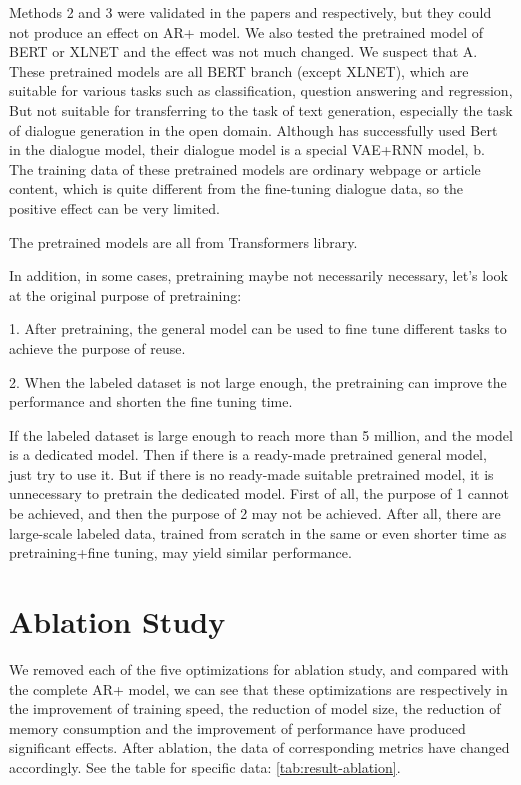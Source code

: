\documentclass[letterpaper]{article} %
\DeclareRobustCommand{\citeext}[1]{\cite[#1]{#1}}
\begin{document}
Methods 2 and 3 were validated in the papers \citeext{Devlin2019} and \citeext{Zhao2019} respectively, but they could not produce an effect on AR+ model. We also tested the pretrained model of BERT or XLNET\citeext{Yang2019} and the effect was not much changed. We suspect that A. These pretrained models are all BERT branch (except XLNET), which are suitable for various tasks such as classification, question answering and regression, But not suitable for transferring to the task of text generation, especially the task of dialogue generation in the open domain. Although \citeext{Zhao2019} has successfully used Bert in the dialogue model, their dialogue model is a special VAE+RNN model, b. The training data of these pretrained models are ordinary webpage or article content, which is quite different from the fine-tuning dialogue data, so the positive effect can be very limited. 

The pretrained models are all from Transformers library\citeext{Wolf2019HuggingFacesTS}.

In addition, in some cases, pretraining maybe not necessarily necessary, let's look at the original purpose of pretraining: 

1. After pretraining, the general model can be used to fine tune different tasks to achieve the purpose of reuse.

2. When the labeled dataset is not large enough, the pretraining can improve the performance and shorten the fine tuning time.

If the labeled dataset is large enough to reach more than 5 million, and the model is a dedicated model. Then if there is a ready-made pretrained general model, just try to use it. But if there is no ready-made suitable pretrained model, it is unnecessary to pretrain the dedicated model. First of all, the purpose of 1 cannot be achieved, and then the purpose of 2 may not be achieved. After all, there are large-scale labeled data, trained from scratch in the same or even shorter time as pretraining+fine tuning, may yield similar performance.


\section[Ablation Study]{Ablation Study} 
We removed each of the five optimizations for ablation study, and compared with the complete AR+ model, we can see that these optimizations are respectively in the improvement of training speed, the reduction of model size, the reduction of memory consumption and the improvement of performance have produced significant effects. After ablation, the data of corresponding metrics have changed accordingly. See the table for specific data: \ref{tab:result-ablation}.
 
\end{document}
